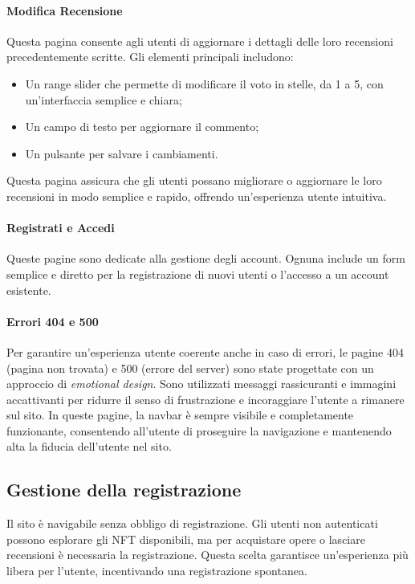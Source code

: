 \documentclass[10pt]{article}
\begin{document}
\paragraph{Modifica Recensione} Questa pagina consente agli utenti di aggiornare i dettagli delle loro recensioni precedentemente scritte. Gli elementi principali includono:
\begin{itemize}
\item Un range slider che permette di modificare il voto in stelle, da 1 a 5, con un’interfaccia semplice e chiara;
\item Un campo di testo per aggiornare il commento;
\item Un pulsante per salvare i cambiamenti.
\end{itemize}
Questa pagina assicura che gli utenti possano migliorare o aggiornare le loro recensioni in modo semplice e rapido, offrendo un'esperienza utente intuitiva.

\paragraph{Registrati e Accedi} Queste pagine sono dedicate alla gestione degli account. Ognuna include un form semplice e diretto per la registrazione di nuovi utenti o l’accesso a un account esistente.

\paragraph{Errori 404 e 500} Per garantire un’esperienza utente coerente anche in caso di errori, le pagine 404 (pagina non trovata) e 500 (errore del server) sono state progettate con un approccio di \textit{emotional design}. Sono utilizzati messaggi rassicuranti e immagini accattivanti per ridurre il senso di frustrazione e incoraggiare l’utente a rimanere sul sito. In queste pagine, la navbar è sempre visibile e completamente funzionante, consentendo all’utente di proseguire la navigazione e mantenendo alta la fiducia dell’utente nel sito.

\subsection{Gestione della registrazione}
Il sito è navigabile senza obbligo di registrazione. Gli utenti non autenticati possono esplorare gli NFT disponibili, ma per acquistare opere o lasciare recensioni è necessaria la registrazione. Questa scelta garantisce un’esperienza più libera per l'utente, incentivando una registrazione spontanea.
\end{document}
